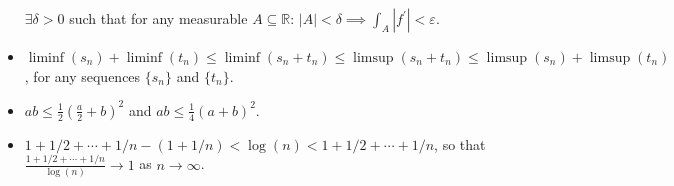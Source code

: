 \documentclass[12pt,reqno]{article}
\theoremstyle{plain}
\theoremstyle{definition}
\begin{document}
\begin{itemize}
     $\exists \delta > 0$ such that for any 
     measurable $A \subseteq \mathbb{R}$: 
     $|A| < \delta \implies \int_A |f^{\prime}| < \varepsilon$. 
\item $\liminf(s_n)+\liminf(t_n) \leq \liminf(s_n+t_n) \leq \limsup(s_n+t_n) \leq 
     \limsup(s_n) + \limsup(t_n)$, for any sequences $\{s_n\}$ and $\{t_n\}$. 
\item $ab \leq \frac{1}{2}\left(\frac{a}{2} + b\right)^2$ and 
     $ab \leq \frac{1}{4} (a+b)^2$. 
\item $1+1/2+\cdots+1/n -(1+1/n) < \log(n) < 1+1/2+\cdots+1/n$, so that 
     $\frac{1+1/2+\cdots+1/n}{\log(n)} \rightarrow 1$ as 
     $n \rightarrow \infty$. 

\end{itemize} 
\end{document}
